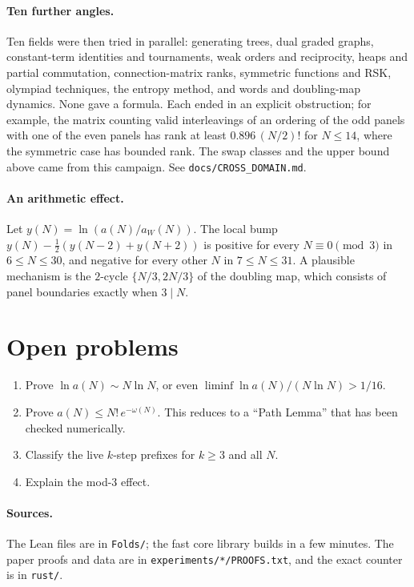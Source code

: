 \documentclass[11pt]{article}
\theoremstyle{definition}
\theoremstyle{remark}
\begin{document}
\paragraph{Ten further angles.}
Ten fields were then tried in parallel: generating trees, dual graded graphs,
constant-term identities and tournaments, weak orders and reciprocity, heaps and partial
commutation, connection-matrix ranks, symmetric functions and RSK, olympiad techniques,
the entropy method, and words and doubling-map dynamics. None gave a formula. Each ended
in an explicit obstruction; for example, the matrix counting valid interleavings of an
ordering of the odd panels with one of the even panels has rank at least
$0.896\,(N/2)!$ for $N\le14$, where the symmetric case has bounded rank. The swap
classes and the upper bound above came from this campaign. See
\texttt{docs/CROSS\_DOMAIN.md}.

\paragraph{An arithmetic effect.}
Let $y(N)=\ln(a(N)/a_W(N))$. The local bump $y(N)-\tfrac12(y(N-2)+y(N+2))$ is positive
for every $N\equiv0\pmod 3$ in $6\le N\le30$, and negative for every other $N$ in
$7\le N\le 31$. A plausible mechanism is the $2$-cycle $\{N/3,2N/3\}$ of the doubling
map, which consists of panel boundaries exactly when $3\mid N$.

\section{Open problems}
\begin{enumerate}
  \item Prove $\ln a(N)\sim N\ln N$, or even $\liminf \ln a(N)/(N\ln N)>1/16$.
  \item Prove $a(N)\le N!\,e^{-\omega(N)}$. This reduces to a ``Path Lemma'' that has
    been checked numerically.
  \item Classify the live $k$-step prefixes for $k\ge3$ and all $N$.
  \item Explain the mod-$3$ effect.
\end{enumerate}

\paragraph{Sources.} The Lean files are in \texttt{Folds/}; the fast core library builds in a few minutes.
The paper proofs and data are in \texttt{experiments/*/PROOFS.txt}, and the exact counter
is in \texttt{rust/}.
\end{document}

